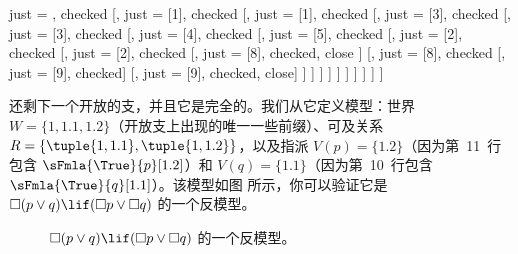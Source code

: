 \documentclass[../../../include/open-logic-section]{subfiles}
\begin{document}
{\begin{ex}
\begin{oltableau}
      just = \TAss, checked
      [,
        just = {\TRule{\False}{\lif}[1]}, checked
        [,
          just = {\TRule{\False}{\lif}[1]}, checked
          [,
            just = {\TRule{\False}{\lor}[3]}, checked
            [,
              just = {\TRule{\False}{\lor}[3]}, checked
              [,
                just = {\TRule{\False}{\Box}[4]}, checked
                [,
                  just = {\TRule{\False}{\Box}[5]}, checked
                  [,
                    just = {\TRule{\True}{\Box}[2]}, checked
                    [,
                      just = {\TRule{\True}{\Box}[2]}, checked
                      [,
                        just = {\TRule{\True}{\lor}[8]}, checked, close
                      ]
                      [,
                        just = {\TRule{\True}{\lor}[8]}, checked
                        [,
                          just = {\TRule{\True}{\lor}[9]}, checked]
                        [,
                          just = {\TRule{\True}{\lor}[9]}, checked, close]
                      ]
                    ]
                  ]
                ]
              ]
            ]
          ]
        ]
      ]
    ]
  \end{oltableau}
  还剩下一个开放的支，并且它是完全的。我们从它定义模型：世界 $W = \{1, 1.1, 1.2\}$（开放支上出现的唯一一些前缀）、可及关系
  $R = \{\tuple{1, 1.1}, \tuple{1, 1.2}\}$，以及指派 $V(p) =
  \{1.2\}$（因为第~11~行包含 $\sFmla{\True}{p}[1.2]$）和
  $V(q) = \{1.1\}$（因为第~10~行包含
  $\sFmla{\True}{q}[1.1]$）。该模型如图
   所示，你可以验证它是
  $\Box(p \lor q) \lif (\Box p \lor \Box q)$ 的一个反模型。
  \begin{figure}
  \begin{center}
  \end{center}
  \caption{$\Box(p \lor q) \lif (\Box p \lor \Box
    q)$ 的一个反模型。}
\end{figure}
\end{ex}
}
\end{document}
